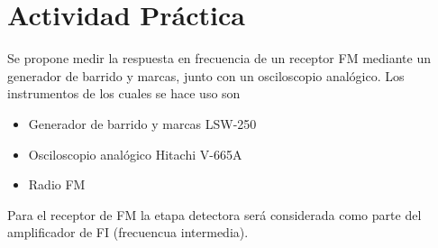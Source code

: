   \pagebreak
  \section{Actividad Práctica}
    Se propone medir la respuesta en frecuencia de un receptor FM mediante un generador de barrido y marcas, junto
    con un osciloscopio analógico. Los instrumentos de los cuales se hace uso son

    \begin{itemize}
      \item Generador de barrido y marcas LSW-250
      \item Osciloscopio analógico Hitachi V-665A
      \item Radio FM
    \end{itemize}

    Para el receptor de FM la etapa detectora será considerada como parte del amplificador de FI (frecuencua intermedia).
    
    
    
    
